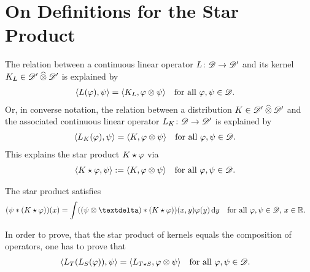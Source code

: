 \section{On Definitions for the Star Product}


The relation between a continuous linear operator
$ L \colon \mathscr{  D  } \to \mathscr{  D  }' $ and its kernel $ K_L \in \mathscr{  D  }' \mathbin{\widehat{\otimes}} \mathscr{  D  }' $
is explained by
\begin{align}
    \langle  L(\varphi)  ,  \psi  \rangle
    =
    \langle  K_L  ,  \varphi \otimes \psi  \rangle
    &&&\text{for all $ \varphi,\psi \in \mathscr{  D  } $.}
\end{align}
Or, in converse notation, the relation between a distribution
$ K \in \mathscr{  D  }' \mathbin{\widehat{\otimes}} \mathscr{  D  }' $ and the associated
continuous linear operator $ L_K \colon \mathscr{  D  } \to \mathscr{  D  }' $
is explained by
\begin{align}
    \langle  L_K( \varphi )  ,  \psi  \rangle
    =
    \langle  K  ,  \varphi \otimes \psi  \rangle
    &&&\text{for all $ \varphi,\psi \in \mathscr{  D  } $.}
\end{align}
This explains the star product $ K \star \varphi $ via
\begin{align}
    \langle  K \star \varphi  ,  \psi  \rangle
    :=
    \langle  K  ,  \varphi \otimes \psi  \rangle
    &&&\text{for all $ \varphi,\psi \in \mathscr{  D  } $.}
\end{align}

The star product satisfies
\begin{align}
    ( \ps * ( K \star \ph ) )( x )
    =
    \int ( ( \ps \tepro \sfdeo ) * ( K \star \ph ) )(x,y) \ph(y) \intd{y}
    &&&\text{for all $ \ph,\ps \in \fsTest $, $ x \in \nrR $.}
\end{align}

In order to prove, that the star product of kernels
equals the composition of operators,
one has to prove that
\begin{align}
    \langle  L_T( L_S( \varphi ) )  ,  \psi  \rangle
    =
    \langle  L_{T\star S}  ,  \varphi \otimes \psi  \rangle
    &&&\text{for all $ \varphi,\psi \in \mathscr{  D  } $.}
\end{align}



